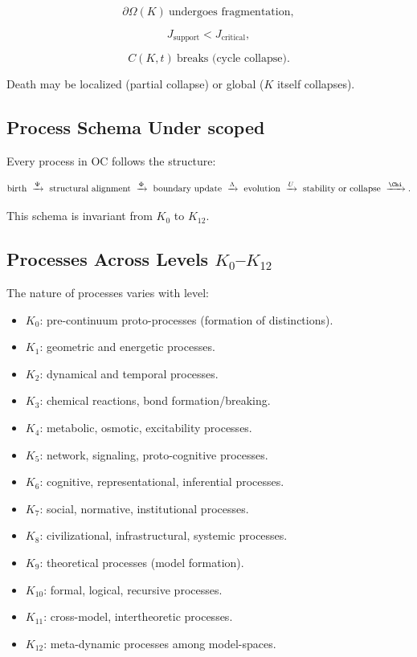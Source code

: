 \[
\partial\Omega(K) \ \text{undergoes fragmentation},
\]

\[
J_{\mathrm{support}} < J_{\mathrm{critical}},
\]

\[
C(K,t) \ \text{breaks (cycle collapse)}.
\]

Death may be localized (partial collapse) or global ($K$ itself collapses).

\subsection{Process Schema Under scoped}

Every process in OC follows the structure:

\[
\text{birth}
\ \xrightarrow{\Psi}
\ \text{structural alignment}
\ \xrightarrow{\Phi}
\ \text{boundary update}
\ \xrightarrow{\Lambda}
\ \text{evolution}
\ \xrightarrow{U}
\ \text{stability or collapse}
\ \xrightarrow{\Chi}.
\]

This schema is invariant from $K_0$ to $K_{12}$.

\subsection{Processes Across Levels \texorpdfstring{$K_0$}{K_0}--$K_{12}$}

The nature of processes varies with level:

\begin{itemize}
    \item $K_0$: pre-continuum proto-processes (formation of distinctions).
    \item $K_1$: geometric and energetic processes.
    \item $K_2$: dynamical and temporal processes.
    \item $K_3$: chemical reactions, bond formation/breaking.
    \item $K_4$: metabolic, osmotic, excitability processes.
    \item $K_5$: network, signaling, proto-cognitive processes.
    \item $K_6$: cognitive, representational, inferential processes.
    \item $K_7$: social, normative, institutional processes.
    \item $K_8$: civilizational, infrastructural, systemic processes.
    \item $K_9$: theoretical processes (model formation).
    \item $K_{10}$: formal, logical, recursive processes.
    \item $K_{11}$: cross-model, intertheoretic processes.
    \item $K_{12}$: meta-dynamic processes among model-spaces.
\end{itemize}

